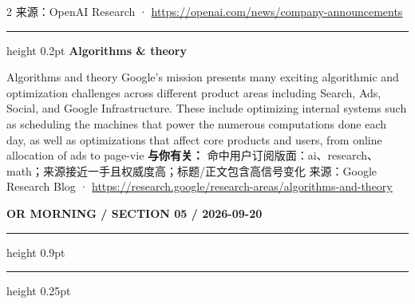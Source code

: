\documentclass[10.5pt]{ctexart}
\begin{document}
\begin{multicols}{2}
{\footnotesize\color{ormuted} 来源：OpenAI Research · \url{https://openai.com/news/company-announcements}}
\vspace{2mm}
\hrule height 0.2pt
\vspace{2mm}
{\large\bfseries Algorithms \& theory}\par
Algorithms and theory Google’s mission presents many exciting algorithmic and optimization challenges across different product areas including Search, Ads, Social, and Google Infrastructure. These include optimizing internal systems such as scheduling the machines that power the numerous computations done each day, as well as optimizations that affect core products and users, from online allocation of ads to page-vie
\textbf{与你有关：} 命中用户订阅版面：ai、research、math；来源接近一手且权威度高；标题/正文包含高信号变化
{\footnotesize\color{ormuted} 来源：Google Research Blog · \url{https://research.google/research-areas/algorithms-and-theory}}
\end{multicols}
\newpage
{\small\bfseries OR MORNING / SECTION 05 / 2026-09-20}
\vspace{2mm}
\hrule height 0.9pt
\vspace{1.5mm}
\hrule height 0.25pt
\vspace{4mm}
\end{document}
